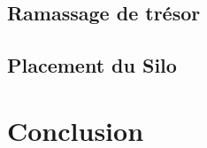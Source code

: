 \documentclass[11pt]{article}
\begin{document}
\subsection{Ramassage de trésor}
\subsection{Placement du Silo}
\section{Conclusion}
\end{document}
